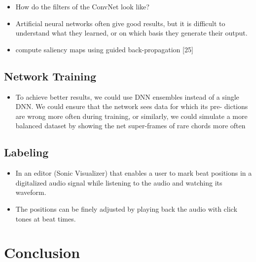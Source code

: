 \documentclass{scrartcl}
\begin{document}
\begin{itemize}
\item How do the filters of the ConvNet look like?
\item Artificial neural networks often give good results, but it is difficult to understand what they learned, or on which basis they generate their output.
\item compute saliency maps using guided back-propagation [25]
\end{itemize}



\subsection{Network Training}

\begin{itemize}
\item To achieve better results, we could use DNN ensembles instead of a single DNN. We could ensure that the network sees data for which its pre- dictions are wrong more often during training, or similarly, we could simulate a more balanced dataset by showing the net super-frames of rare chords more often \cite{Korzeniowski2016}
\end{itemize}



\subsection{Labeling}

\begin{itemize}
\item In an editor (Sonic Visualizer) that enables a user to mark beat positions in a digitalized audio signal while listening to the audio and watching its waveform.
\item The positions can be finely adjusted by playing back the audio with click tones at beat times.
\end{itemize}


\newpage 

\section{Conclusion}
\end{document}
